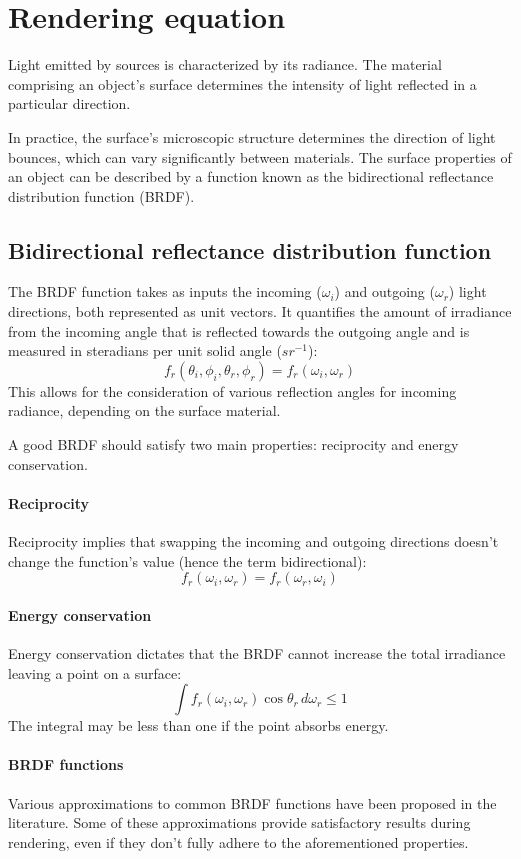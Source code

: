 \section{Rendering equation}

Light emitted by sources is characterized by its radiance. 
The material comprising an object's surface determines the intensity of light reflected in a particular direction.

In practice, the surface's microscopic structure determines the direction of light bounces, which can vary significantly between materials.
The surface properties of an object can be described by a function known as the bidirectional reflectance distribution function (BRDF).

\subsection{Bidirectional reflectance distribution function}
The BRDF function takes as inputs the incoming ($\omega_i$) and outgoing ($\omega_r$) light directions, both represented as unit vectors.
It quantifies the amount of irradiance from the incoming angle that is reflected towards the outgoing angle and is measured in steradians per unit solid angle ($sr^{-1}$):
\[f_r(\theta_i,\phi_i,\theta_r,\phi_r)=f_r(\omega_i,\omega_r)\]
This allows for the consideration of various reflection angles for incoming radiance, depending on the surface material.

A good BRDF should satisfy two main properties: reciprocity and energy conservation. 

\paragraph*{Reciprocity}
Reciprocity implies that swapping the incoming and outgoing directions doesn't change the function's value (hence the term bidirectional):
\[f_r(\omega_i,\omega_r)=f_r(\omega_r,\omega_i)\]

\paragraph*{Energy conservation}
Energy conservation dictates that the BRDF cannot increase the total irradiance leaving a point on a surface:
\[\int f_r(\omega_i,\omega_r)\cos\theta_r\, d\omega_r \leq 1\]
The integral may be less than one if the point absorbs energy.

\paragraph*{BRDF functions}
Various approximations to common BRDF functions have been proposed in the literature.
Some of these approximations provide satisfactory results during rendering, even if they don't fully adhere to the aforementioned properties.

